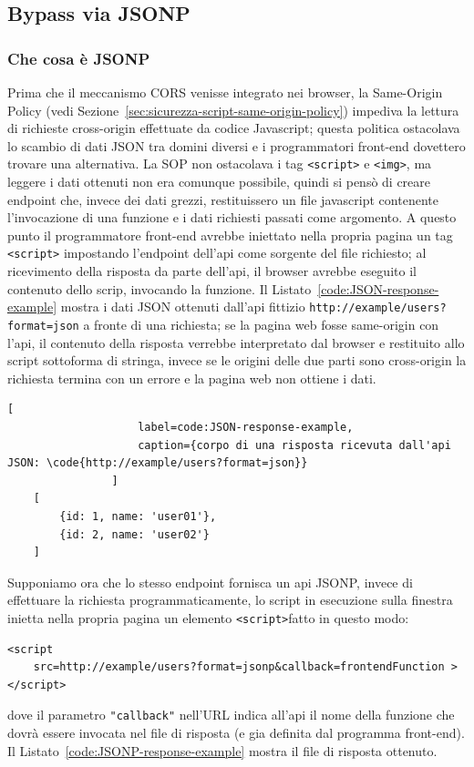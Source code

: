 \documentclass{sapthesis}
\newcommand{\code}[1]{\texttt{#1}}
\newcommand{\refSection}[1]{Sezione~\ref{#1}}
\newcommand{\refCode}[1]{Listato~\ref{#1}}
\newcommand{\JS}{Javascript}
\newcommand{\tagHTML}[1]{\code{<#1>}}
\newcommand{\img}{\tagHTML{img}}
\newcommand{\script}{\tagHTML{script}}
\begin{document}
            \subsection{Bypass via JSONP}
                \subsubsection{Che cosa è JSONP}
                Prima che il meccanismo CORS venisse integrato nei browser, la Same-Origin Policy (vedi \refSection{sec:sicurezza-script-same-origin-policy}) 
                impediva la lettura di richieste cross-origin effettuate da codice \JS{}; questa politica ostacolava
                lo scambio di dati JSON tra domini diversi e i programmatori front-end dovettero trovare una
                alternativa. La SOP non ostacolava i tag \script{} e \img{}, ma leggere i dati ottenuti non era
                comunque possibile, quindi si pensò di creare endpoint che, invece dei dati grezzi, restituissero
                un file javascript contenente l'invocazione di una funzione e i dati richiesti passati come argomento.
                A questo punto il programmatore front-end avrebbe iniettato nella propria pagina un tag \script{}
                impostando l'endpoint dell'api come sorgente del file richiesto; al ricevimento della risposta 
                da parte dell'api, il browser avrebbe eseguito il contenuto dello scrip, invocando la funzione.
                Il \refCode{code:JSON-response-example} mostra i dati JSON ottenuti dall'api fittizio
                \code{http://example/users?format=json} a fronte di una richiesta; se la pagina web fosse
                same-origin con l'api, il contenuto della risposta verrebbe interpretato dal browser e restituito
                allo script sottoforma di stringa, invece se le origini delle due parti sono cross-origin la richiesta
                termina con un errore e la pagina web non ottiene i dati.\\

                \begin{lstlisting}[
                    label=code:JSON-response-example,
                    caption={corpo di una risposta ricevuta dall'api JSON: \code{http://example/users?format=json}}
                ]
    [
        {id: 1, name: 'user01'},
        {id: 2, name: 'user02'}
    ]
                \end{lstlisting}

                Supponiamo ora che lo stesso endpoint fornisca un api JSONP, invece di effettuare la richiesta
                programmaticamente, lo script in esecuzione sulla finestra inietta nella propria pagina un
                elemento \script fatto in questo modo: 
                \begin{lstlisting}[numbers=none]
<script 
    src=http://example/users?format=jsonp&callback=frontendFunction >
</script>
                \end{lstlisting}
                dove il parametro \code{"callback"} nell'URL indica all'api il nome della funzione che dovrà essere
                invocata nel file di risposta (e gia definita dal programma front-end). Il \refCode{code:JSONP-response-example}
                mostra il file di risposta ottenuto.
\end{document}
